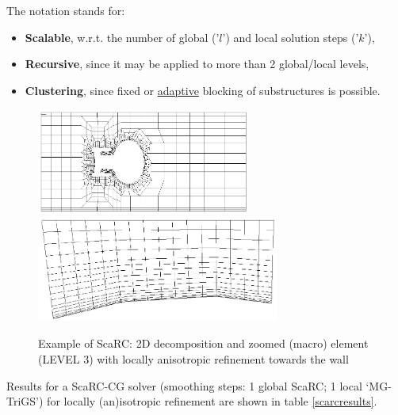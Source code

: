 

The notation \scarc stands for:
\begin{itemize}
\item {\bf Scalable}, w.r.t. the number of global ('$l$') and local solution steps ('$k$'),
\item {\bf Recursive}, since it may be applied to more than 2 global/local levels,
\item {\bf Clustering}, since fixed or \underline{adaptive} blocking of substructures is possible.
\end{itemize}


\begin{figure}[!h]
\begin{center}
\includegraphics[width=7cm]{../psfiles/gitter1.ps}
\includegraphics[width=8cm]{../psfiles/makro.ps} 
\end{center}
\caption{Example of ScaRC: 2D decomposition and zoomed (macro) element (LEVEL 3) with locally anisotropic 
refinement towards the wall}
\label{scarcexamplegrid}
\end{figure}


Results for a ScaRC-CG solver (smoothing steps: 1 global ScaRC; 1 local `MG-TriGS') 
for locally (an)isotropic refinement are shown in table \ref{scarcresults}.



